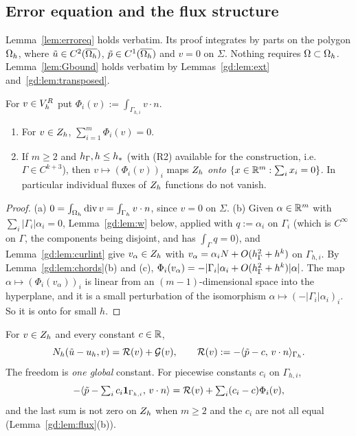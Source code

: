 \subsection{Error equation and the flux structure}\label{gd:sec:err}

Lemma~\ref{lem:erroreq} holds verbatim. Its proof integrates by parts on the polygon $\Omega_h$, where $\tilde u\in C^2(\overline{\Omega_h})$, $\tilde p\in C^1(\overline{\Omega_h})$ and $v=0$ on $\Sigma$. Nothing requires $\Omega\subset\Omega_h$. Lemma~\ref{lem:Gbound} holds verbatim by Lemmas~\ref{gd:lem:ext} and~\ref{gd:lem:transposed}.

For $v\in V_h^R$ put $\Phi_i(v):=\int_{\Gamma_{h,i}}v\cdot n$.

\begin{lemma}[Fluxes]\label{gd:lem:flux}
\leavevmode
\begin{enumerate}[label=(\alph*)]
\item For $v\in Z_h$, $\sum_{i=1}^m\Phi_i(v)=0$.
\item If $m\ge2$ and $h_\Gamma,h\le h_\ast$ (with (R2) available for the construction, i.e.\ $\Gamma\in C^{k+3}$), then $v\mapsto(\Phi_i(v))_i$ maps $Z_h$ \emph{onto} $\{x\in\mathbb R^m:\sum_ix_i=0\}$. In particular individual fluxes of $Z_h$ functions do not vanish.
\end{enumerate}
\end{lemma}

\begin{proof}
(a) $0=\int_{\Omega_h}\operatorname{div} v=\int_{\Gamma_h}v\cdot n$, since $v=0$ on $\Sigma$.
(b) Given $\alpha\in\mathbb R^m$ with $\sum_i|\Gamma_i|\alpha_i=0$, Lemma~\ref{gd:lem:w} below, applied with $q:=\alpha_i$ on $\Gamma_i$ (which is $C^\infty$ on $\Gamma$, the components being disjoint, and has $\int_\Gamma q=0$), and Lemma~\ref{gd:lem:curlint} give $v_\alpha\in Z_h$ with $v_\alpha=\alpha_iN+O(h_\Gamma^2+h^k)$ on $\Gamma_{h,i}$. By Lemma~\ref{gd:lem:chords}(b) and (c), $\Phi_i(v_\alpha)=-|\Gamma_i|\alpha_i+O(h_\Gamma^2+h^k)|\alpha|$. The map $\alpha\mapsto(\Phi_i(v_\alpha))_i$ is linear from an $(m-1)$-dimensional space into the hyperplane, and it is a small perturbation of the isomorphism $\alpha\mapsto(-|\Gamma_i|\alpha_i)_i$. So it is onto for small $h$.
\end{proof}

\begin{corollary}\label{gd:cor:GSerr}
For $v\in Z_h$ and every constant $c\in\mathbb R$,
\[
N_h(\tilde u-u_h,v)=\mathcal R(v)+\mathcal G(v),\qquad\mathcal R(v):=-\langle \tilde p-c,\, v\cdot n\rangle_{\Gamma_h}.
\]
The freedom is \emph{one global} constant. For piecewise constants $c_i$ on $\Gamma_{h,i}$,
\[
-\langle \tilde p-\textstyle\sum_ic_i\mathbf 1_{\Gamma_{h,i}},\, v\cdot n\rangle=\mathcal R(v)+\sum_i(c_i-c)\Phi_i(v),
\]
and the last sum is not zero on $Z_h$ when $m\ge2$ and the $c_i$ are not all equal (Lemma~\ref{gd:lem:flux}(b)).
\end{corollary}

